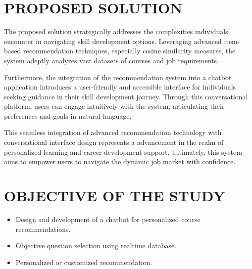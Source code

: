 \section{\uppercase{Proposed Solution}}
The proposed solution strategically addresses the complexities individuals encounter
in navigating skill development options. Leveraging advanced item-based
recommendation techniques, especially cosine similarity measures, the system
adeptly analyzes vast datasets of courses and job requirements.

Furthermore, the integration of the recommendation system into a chatbot application
introduces a user-friendly and accessible interface for individuals seeking guidance
in their skill development journey. Through this conversational platform, users can
engage intuitively with the system, articulating their preferences and goals in
natural language.

This seamless integration of advanced recommendation technology with
conversational interface design represents a advancement in the
realm of personalized learning and career development support. Ultimately, this system aims to empower users to navigate the dynamic job market with
confidence.

\section{\uppercase{Objective of the Study}}
\begin{itemize}
    \item Design and development of a chatbot for personalized course recommendations.

    \item Objective question selection using realtime database.

    \item Personalized or customized recommendation.
\end{itemize}

